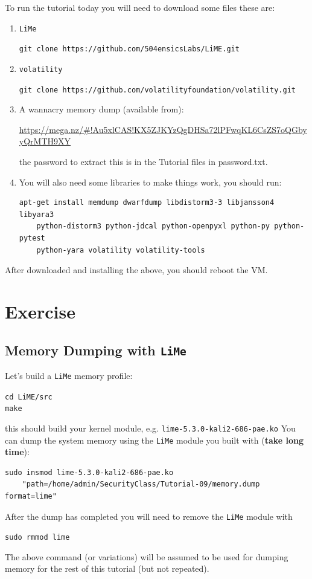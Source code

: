 \documentclass{article}
\begin{document}
\noindent To run the tutorial today you will need to download some files
these are:
\begin{enumerate}
    \item \lstinline{LiMe} 
    \begin{center}
    \lstinline{git clone https://github.com/504ensicsLabs/LiME.git}
\end{center}
    \item \lstinline{volatility}
    \begin{center}
    \lstinline{git clone https://github.com/volatilityfoundation/volatility.git}
\end{center}
    \item A wannacry memory dump (available from):
    \begin{center}
    \url{https://mega.nz/#!Au5xlCAS!KX5ZJKYzQgDHSa72lPFwqKL6CsZS7oQGbyyQrMTH9XY}
\end{center}
the password to extract this is in the Tutorial files in password.txt.
    \item You will also need some libraries to make things work, you should run:
    \begin{lstlisting}
apt-get install memdump dwarfdump libdistorm3-3 libjansson4 libyara3
    python-distorm3 python-jdcal python-openpyxl python-py python-pytest
    python-yara volatility volatility-tools
    \end{lstlisting}
\end{enumerate}
\noindent After downloaded and installing the above, you should reboot the VM.

\section{Exercise}
\subsection{Memory Dumping with  \lstinline{LiMe}}
Let's build a \lstinline{LiMe} memory profile:
\begin{center}
    \lstinline{cd LiME/src}\\
    \lstinline{make}
\end{center}
\noindent this should build your kernel module, e.g. \lstinline{lime-5.3.0-kali2-686-pae.ko} You can dump the system memory using the \lstinline{LiMe} module you built with (\textbf{take long time}):
\begin{lstlisting}
sudo insmod lime-5.3.0-kali2-686-pae.ko
    "path=/home/admin/SecurityClass/Tutorial-09/memory.dump format=lime"
    \end{lstlisting}
\noindent After the dump has completed you will need to remove the \lstinline{LiMe} module
with
\begin{center}
    \lstinline{sudo rmmod lime}
\end{center}
\noindent The above command (or variations) will be assumed to be used for dumping memory for the rest of this tutorial (but not repeated).
\end{document}
